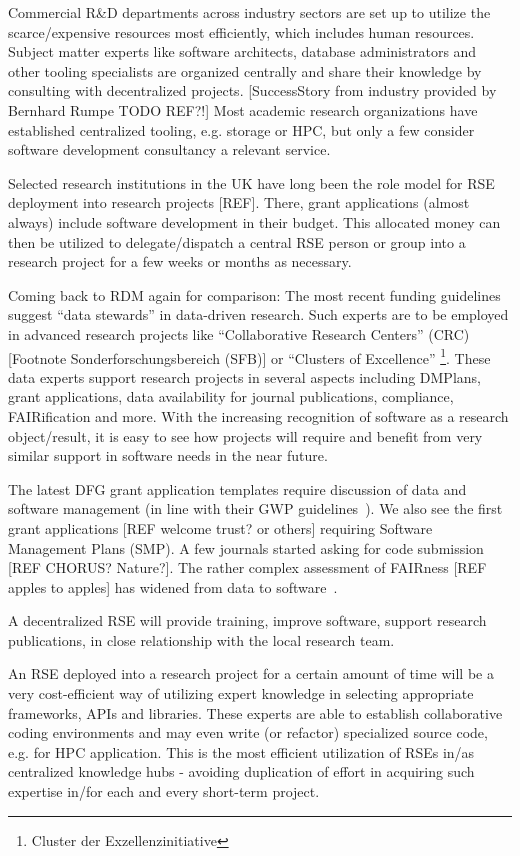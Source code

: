 \documentclass{article}
\makeatletter
\newcommand*{\eg}{e.g.\@\xspace}
\makeatother
\begin{document}
Commercial R\&D departments across industry sectors are set up to utilize the scarce/expensive resources most efficiently, which includes human resources.
Subject matter experts like software architects, database administrators and other tooling specialists are organized centrally and share their knowledge by consulting with decentralized projects.
[SuccessStory from industry provided by Bernhard Rumpe TODO REF?!]
Most academic research organizations have established centralized tooling, e.g. storage or HPC, but only a few consider software development consultancy a relevant service. 

Selected research institutions in the UK have long been the role model for RSE deployment into research projects [REF].
There, grant applications (almost always) include software development in their budget.
This allocated money can then be utilized to delegate/dispatch a central RSE person or group into a research project for a few weeks or months as necessary.

Coming back to RDM again for comparison: The most recent funding guidelines suggest  “data stewards” in data-driven research.
Such experts are to be employed in advanced research projects like “Collaborative Research Centers” (CRC)[Footnote Sonderforschungsbereich (SFB)] or “Clusters of Excellence”
\footnote{Cluster der Exzellenzinitiative}.
These data experts support research projects in several aspects including DMPlans, grant applications, data availability for journal publications, compliance, FAIRification and more.
With the increasing recognition of software as a research object/result, it is easy to see how projects will require and benefit from very similar support in software needs in the near future.

The latest DFG grant application templates require discussion of data and software management (in line with their GWP guidelines~\autocite{dfg_gsp}).
We also see the first grant applications [REF welcome trust? or others] requiring Software Management Plans (SMP).
A few journals started asking for code submission [REF CHORUS? Nature?].
The rather complex assessment of FAIRness [REF apples to apples] has widened from data to software~\autocite{fair_data_maturity_model_working_group_2020}.

A decentralized RSE will provide training, improve software, support research publications, in close relationship with the local research team.

An RSE deployed into a research project for a certain amount of time will be a very cost-efficient way of utilizing expert knowledge in selecting appropriate frameworks, APIs and libraries.
These experts are able to establish collaborative coding environments and may even write (or refactor) specialized source code, \eg for HPC application.
This is the most efficient utilization of RSEs in/as centralized knowledge hubs - avoiding duplication of effort in acquiring such expertise in/for each and every short-term project.
\end{document}
